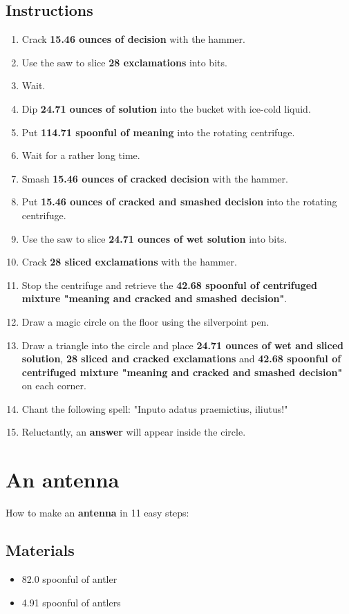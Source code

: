 \documentclass{article}
\begin{document}
\subsection{Instructions}\begin{enumerate}
\item 
Crack \textbf{15.46 ounces of decision} with the hammer.
\item 
Use the saw to slice \textbf{28 exclamations} into bits.
\item 
Wait.
\item 
Dip \textbf{24.71 ounces of solution} into the bucket with ice-cold liquid.
\item 
Put \textbf{114.71 spoonful of meaning} into the rotating centrifuge.
\item 
Wait for a rather long time.
\item 
Smash \textbf{15.46 ounces of cracked decision} with the hammer.
\item 
Put \textbf{15.46 ounces of cracked and smashed decision} into the rotating centrifuge.
\item 
Use the saw to slice \textbf{24.71 ounces of wet solution} into bits.
\item 
Crack \textbf{28 sliced exclamations} with the hammer.
\item 
Stop the centrifuge and retrieve the \textbf{42.68 spoonful of centrifuged mixture "meaning and cracked and smashed decision"}.
\item 
Draw a magic circle on the floor using the silverpoint pen.
\item 
Draw a triangle into the circle and place \textbf{24.71 ounces of wet and sliced solution}, \textbf{28 sliced and cracked exclamations} and \textbf{42.68 spoonful of centrifuged mixture "meaning and cracked and smashed decision"} on each corner.
\item 
Chant the following spell: "Inputo adatus praemictius, iliutus!"
\item 
Reluctantly, an \textbf{answer} will appear inside the circle.
\end{enumerate}
\newpage
\section{An antenna}How to make an \textbf{antenna} in 11 easy steps:

\subsection{Materials}\begin{itemize}
\item 
82.0 spoonful of antler
\item 
4.91 spoonful of antlers
\end{itemize}
\end{document}
